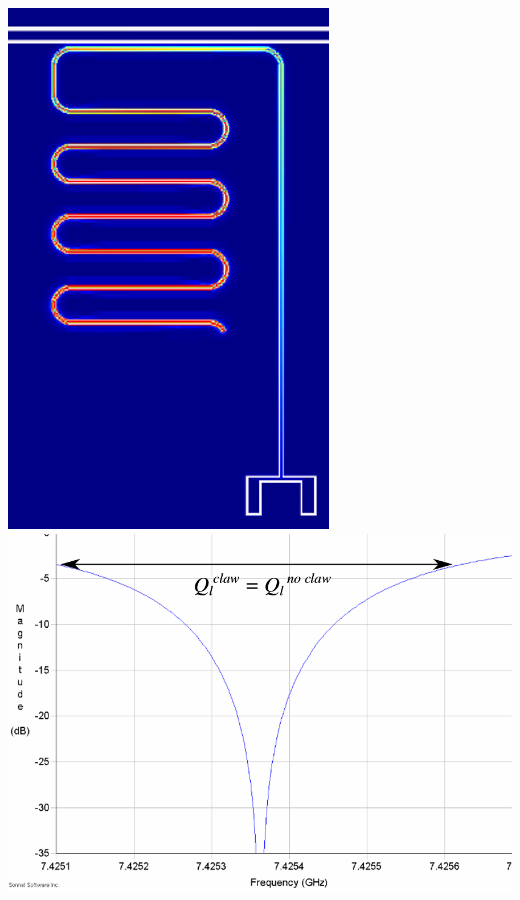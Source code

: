 \documentclass[aspectratio=169, 13pt, t]{beamer}
\begin{document}
\begin{frame}[t]
{	\vspace{0.2cm}
	\begin{columns}[c]
	\centering
	\includegraphics[height=0.7\textheight]{xmonres_sim_claw}
	\centering
	\includegraphics[width=\textwidth]{xmonres_sim_claw_res}
	\end{columns}
}

\end{frame}
\end{document}
